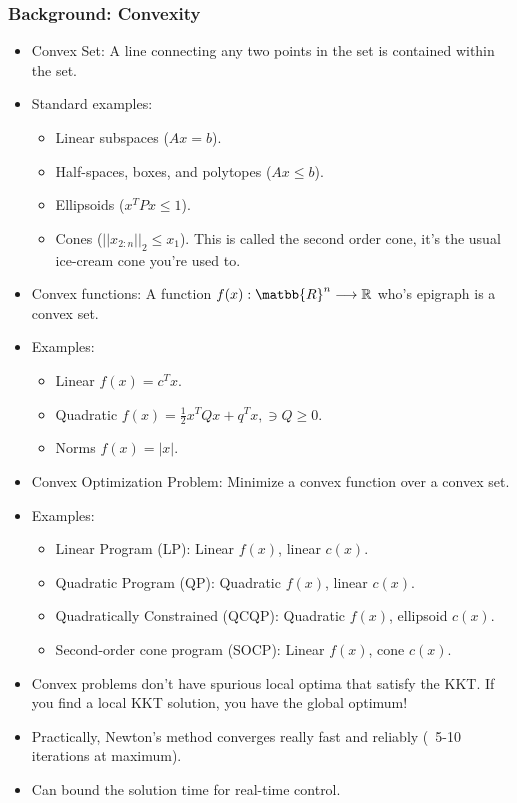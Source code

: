 \subsubsection{Background: Convexity}
\begin{itemize}
    \item Convex Set: A line connecting any two points in the set is contained within the set.
    \item Standard examples:
    \begin{itemize}
        \item Linear subspaces ($Ax=b$). 
        \item Half-spaces, boxes, and polytopes ($Ax\leq b$). 
        \item Ellipsoids ($x^T P x \leq 1$).
        \item Cones ($||x_{2:n}||_2 \leq x_1$). This is called the second order cone, it's the usual ice-cream cone you're used to. 
    \end{itemize}
    \item Convex functions: A function $f(x): \matbb{R}^n \longrightarrow \mathbb{R}$ who's epigraph is a convex set. 
    \item Examples: 
    \begin{itemize}
        \item Linear $f(x) = c^T x$.
        \item Quadratic $f(x) = \frac{1}{2} x^T Q x + q^T x, \ni Q \geq 0$.
        \item Norms $f(x) = |x|$.
    \end{itemize}
    \item Convex Optimization Problem: Minimize a convex function over a convex set. 
    \item Examples:
    \begin{itemize}
        \item Linear Program (LP): Linear $f(x)$, linear $c(x)$.
        \item Quadratic Program (QP): Quadratic $f(x)$, linear $c(x)$. 
        \item Quadratically Constrained (QCQP): Quadratic $f(x)$, ellipsoid $c(x)$. 
        \item Second-order cone program (SOCP): Linear $f(x)$, cone $c(x)$. 
    \end{itemize}
    \item Convex problems don't have spurious local optima that satisfy the KKT. If you find a local KKT solution, you have the global optimum!
    \item Practically, Newton's method converges really fast and reliably (~5-10 iterations at maximum). 
    \item Can bound the solution time for real-time control.
\end{itemize}

